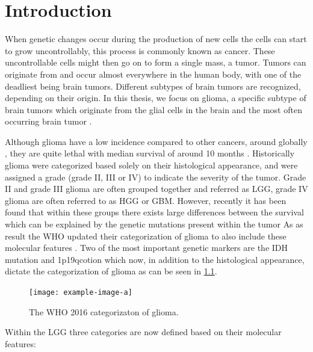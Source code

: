 
\chapter{Introduction}

When genetic changes occur during the production of new cells the cells can start to grow uncontrollably, this process is commonly known as cancer.
These uncontrollable cells might then go on to form a single mass, a tumor.
Tumors can originate from and occur almost everywhere in the human body, with one of the deadliest being brain tumors.
Different subtypes of brain tumors are recognized, depending on their origin.
In this thesis, we focus on glioma, a specific subtype of brain tumors which originate from the glial cells in the brain and the most often occurring brain tumor \autocite{leece2017indicence}.

Although glioma have a low incidence compared to other cancers, around  globally \autocite{leece2017indicence}, they are quite lethal with median survival of around 10 months \autocite{hess2004gliomaincidence}.
Historically glioma were categorized based solely on their histological appearance, and were assigned a grade (grade II, III or IV) to indicate the severity of the tumor.
Grade II and grade III glioma are often grouped together and referred as \gls{LGG}, grade IV glioma are often referred to as \gls{HGG} or \gls{GBM}.
However, recently it has been found that within these groups there exists large differences between the survival which can be explained by the genetic mutations present within the tumor \autocite{eckel2015gliomagroups}
As as result the \gls{WHO} updated their categorization of glioma to also include these molecular features \cite{louis20162016}.
Two of the most important genetic markers are the \gls{IDH} mutation and \acl{1p19qcotion} which now, in addition to the histological appearance, dictate the categorization of glioma as can be seen in \cref{fig:intro_glioma_categorization}.

\begin{figure}[hbt]
    \texttt{[image: example-image-a]}
    \caption{The WHO 2016 categorizaton of glioma.}\label{fig:intro_glioma_categorization}
\end{figure}

Within the \gls{LGG} three categories are now defined based on their molecular features:

